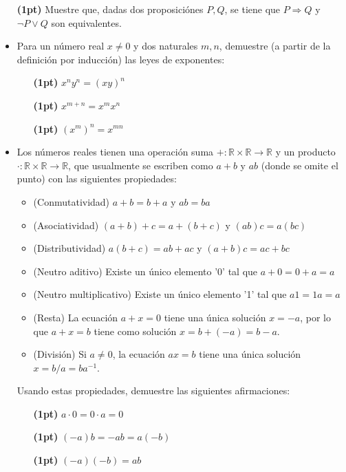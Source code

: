 \documentclass{article}
\newcommand{\R}{\mathbb{R}}
\begin{document}
\begin{itemize}
    \item[\bf (1pt)]  Muestre que, dadas dos proposiciónes $P, Q$, se tiene que $P\Rightarrow Q$ y $\neg P \vee Q$ son equivalentes. 
    \item Para un número real $x\neq 0$ y dos naturales $m,n$, demuestre (a partir de la definición por inducción) las leyes de exponentes: 
        \begin{itemize}
            \item[\bf (1pt)] $x^ny^n = (xy)^n$
            \item[\bf (1pt)] $x^{m+n} = x^mx^n$
            \item[\bf (1pt)] $(x^m)^n = x^{mn}$
        \end{itemize}
    \item Los números reales tienen una operación suma $+:\R\times \R\to \R$ y un producto $\cdot: \R\times\R\to \R$, que usualmente se escriben como $a+b$ y $ab$ (donde se omite el punto)  con las siguientes propiedades:
        \begin{itemize}
            \item (Conmutatividad) $a+b=b+a$ y $ab=ba$
            \item (Asociatividad) $(a+b)+c = a+(b+c)$ y $(ab)c = a(bc)$
            \item (Distributividad) $a(b+c) = ab+ac$ y $(a+b)c = ac+bc$
            \item (Neutro aditivo) Existe un único elemento '0' tal que $a+0 = 0+a = a$
            \item (Neutro multiplicativo) Existe un único elemento '1' tal que $a1 = 1a = a$
            \item (Resta) La ecuación $a+x =0$ tiene una única solución $x=-a$, por lo que $a+x = b$ tiene como solución $x = b + (-a) = b-a$.
            \item (División) Si $a\neq 0$, la ecuación $ax=b$ tiene una única solución $x = b/a = ba^{-1}$. 
        \end{itemize}

        Usando estas propiedades, demuestre las siguientes afirmaciones: 
        \begin{itemize}
            \item[\bf (1pt)]  $a \cdot 0 = 0 \cdot a = 0$
            \item[\bf (1pt)] $(-a)b = -ab = a(-b)$
            \item[\bf (1pt)] $(-a)(-b) = ab$
        \end{itemize}


\end{itemize}
\end{document}

